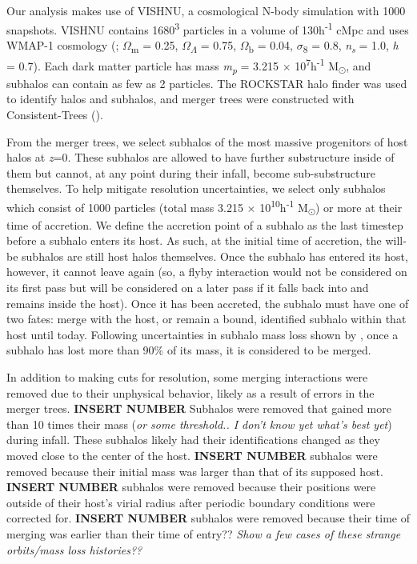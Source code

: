 \documentclass[fleqn,usenatbib]{mnras}
\begin{document}
	Our analysis makes use of VISHNU, a cosmological N-body simulation with 1000 snapshots. VISHNU contains 1680\textsuperscript{3} particles in a volume of 130h\textsuperscript{-1} cMpc and uses WMAP-1 cosmology (\citet{Springel2013}; $\Omega$\textsubscript{m} = 0.25, $\Omega$\textsubscript{$\Lambda$} = 0.75, $\Omega$\textsubscript{b} = 0.04, $\sigma$\textsubscript{8} = 0.8, \textit{n\textsubscript{s}} = 1.0, \textit{h} = 0.7). Each dark matter particle has mass \textit{m\textsubscript{p}} = 3.215 $\times$ 10\textsuperscript{7}h\textsuperscript{-1} M\textsubscript{\(\odot\)}, and subhalos can contain as few as 2 particles. The ROCKSTAR halo finder was used to identify halos and subhalos, and merger trees were constructed with Consistent-Trees (\citet{Behroozi2013b}).
\par
    From the merger trees, we select subhalos of the most massive progenitors of host halos at \textit{z}=0. These subhalos are allowed to have further substructure inside of them but cannot, at any point during their infall, become sub-substructure themselves. To help mitigate resolution uncertainties, we select only subhalos which consist of 1000 particles (total mass 3.215 $\times$ 10\textsuperscript{10}h\textsuperscript{-1} M\textsubscript{\(\odot\)}) or more at their time of accretion. We define the accretion point of a subhalo as the last timestep before a subhalo enters its host. As such, at the initial time of accretion, the will-be subhalos are still host halos themselves. Once the subhalo has entered its host, however, it cannot leave again (so, a flyby interaction would not be considered on its first pass but will be considered on a later pass if it falls back into and remains inside the host). Once it has been accreted, the subhalo must have one of two fates: merge with the host, or remain a bound, identified subhalo within that host until today. Following uncertainties in subhalo mass loss shown by \citet{VDB2018}, once a subhalo has lost more than 90\% of its mass, it is considered to be merged.
\par
    In addition to making cuts for resolution, some merging interactions were removed due to their unphysical behavior, likely as a result of errors in the merger trees. \textbf{INSERT NUMBER} Subhalos were removed that gained more than 10 times their mass (\textit{or some threshold.. I don't know yet what's best yet}) during infall. These subhalos likely had their identifications changed as they moved close to the center of the host. \textbf{INSERT NUMBER} subhalos were removed because their initial mass was larger than that of its supposed host. \textbf{INSERT NUMBER} subhalos were removed because their positions were outside of their host's virial radius after periodic boundary conditions were corrected for. \textbf{INSERT NUMBER} subhalos were removed because their time of merging was earlier than their time of entry?? \textit{Show a few cases of these strange orbits/mass loss histories??}
\end{document}
